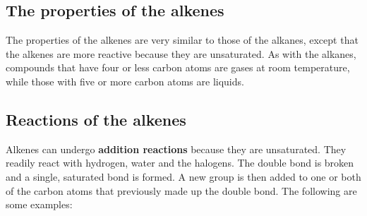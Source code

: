 \subsection{The properties of the alkenes}

The properties of the alkenes are very similar to those of the alkanes, except that the alkenes are more reactive because they are unsaturated. As with the alkanes, compounds that have four or less carbon atoms are gases at room temperature, while those with five or more carbon atoms are liquids.

\subsection{Reactions of the alkenes}

Alkenes can undergo \textbf{addition reactions} because they are unsaturated. They readily react with hydrogen, water and the halogens. The double bond is broken and a single, saturated bond is formed. A new group is then added to one or both of the carbon atoms that previously made up the double bond. The following are some examples:

